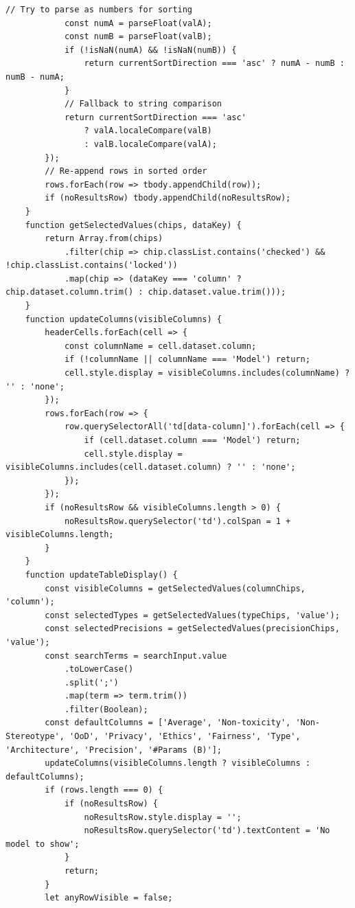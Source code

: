 \documentclass[12pt, a4paper, onecolumn]{report}
\begin{document}
\begin{lstlisting}[language=JS]
            // Try to parse as numbers for sorting
            const numA = parseFloat(valA);
            const numB = parseFloat(valB);
            if (!isNaN(numA) && !isNaN(numB)) {
                return currentSortDirection === 'asc' ? numA - numB : numB - numA;
            }
            // Fallback to string comparison
            return currentSortDirection === 'asc' 
                ? valA.localeCompare(valB) 
                : valB.localeCompare(valA);
        });
        // Re-append rows in sorted order
        rows.forEach(row => tbody.appendChild(row));
        if (noResultsRow) tbody.appendChild(noResultsRow);
    }
    function getSelectedValues(chips, dataKey) {
        return Array.from(chips)
            .filter(chip => chip.classList.contains('checked') && !chip.classList.contains('locked'))
            .map(chip => (dataKey === 'column' ? chip.dataset.column.trim() : chip.dataset.value.trim()));
    }
    function updateColumns(visibleColumns) {
        headerCells.forEach(cell => {
            const columnName = cell.dataset.column;
            if (!columnName || columnName === 'Model') return;
            cell.style.display = visibleColumns.includes(columnName) ? '' : 'none';
        });
        rows.forEach(row => {
            row.querySelectorAll('td[data-column]').forEach(cell => {
                if (cell.dataset.column === 'Model') return;
                cell.style.display = visibleColumns.includes(cell.dataset.column) ? '' : 'none';
            });
        });
        if (noResultsRow && visibleColumns.length > 0) {
            noResultsRow.querySelector('td').colSpan = 1 + visibleColumns.length;
        }
    }
    function updateTableDisplay() {
        const visibleColumns = getSelectedValues(columnChips, 'column');
        const selectedTypes = getSelectedValues(typeChips, 'value');
        const selectedPrecisions = getSelectedValues(precisionChips, 'value');
        const searchTerms = searchInput.value
            .toLowerCase()
            .split(';')
            .map(term => term.trim())
            .filter(Boolean);
        const defaultColumns = ['Average', 'Non-toxicity', 'Non-Stereotype', 'OoD', 'Privacy', 'Ethics', 'Fairness', 'Type', 'Architecture', 'Precision', '#Params (B)'];
        updateColumns(visibleColumns.length ? visibleColumns : defaultColumns);
        if (rows.length === 0) {
            if (noResultsRow) {
                noResultsRow.style.display = '';
                noResultsRow.querySelector('td').textContent = 'No model to show';
            }
            return;
        }
        let anyRowVisible = false;

\end{lstlisting}
\end{document}
